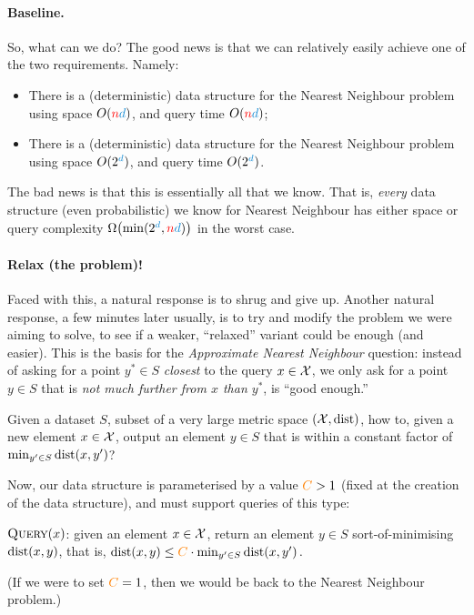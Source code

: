 \paragraph{Baseline.} So, what can we do? The good news is that we can relatively easily achieve one of the two requirements. Namely:
\begin{itemize}
    \item There is a (deterministic) data structure for the Nearest Neighbour problem using space $O(\ns\dims)$, and query time $O(\ns\dims)$;
    \item There is a (deterministic) data structure for the Nearest Neighbour problem using space $O(2^\dims)$, and query time $O(2^\dims)$.
\end{itemize}
The bad news is that this is essentially all that we know. That is, \emph{every} data structure (even probabilistic) we know for Nearest Neighbour has either space or query complexity $\bigOmega{\min(2^\dims, \ns\dims)}$ in the worst case. 

\paragraph{Relax (the problem)!} Faced with this, a natural response is to shrug and give up. Another natural response, a few minutes later usually, is to try and modify the problem we were aiming to solve, to see if a weaker, ``relaxed'' variant could be enough (and easier). This is the basis for the \emph{Approximate Nearest Neighbour} question: instead of asking for a point $y^\ast\in S$ \emph{closest} to the query $x\in\mathcal{X}$, we only ask for a point $y\in S$ that is \emph{not much further from $x$ than $y^\ast$}, \ie is ``good enough.''
\begin{framed}
    Given a dataset $S$, subset of a very large metric space $(\mathcal{X},\operatorname{dist})$, how to, given a new element $x\in\mathcal{X}$, output an element $y\in S$ that is within a constant factor of $\min_{y'\in S}\dist{x}{y'}$?
\end{framed}
Now, our data structure is parameterised by a value $\textcolor{orange}{C}>1$ (fixed at the creation of the data structure), and must support queries of this type:
\begin{framed}
\noindent$\textsc{Query}(x)$: given an element $x\in \mathcal{X}$, return an element $y\in S$ sort-of-minimising $\dist{x}{y}$, that is,
$
    \dist{x}{y} \leq \orange{C}\cdot  \min_{y'\in S} \dist{x}{y'}\,.
$
\end{framed}
\noindent(If we were to set $\textcolor{orange}{C}=1$, then we would be back to the Nearest Neighbour problem.)
